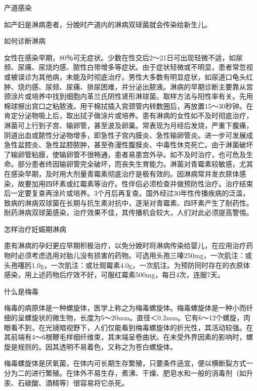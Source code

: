\documentclass[12pt,UTF8,openany]{ctexbook}
\begin{document}
产道感染

如产妇是淋病患者，分娩时产道内的淋病双球菌就会传染给新生儿。





如何诊断淋病


女性在感染早期，80％可无症状。少数在性交后2～21日可出现轻微不适，如尿频、尿痛、尿烧灼感、脓性白带增多等症状。由于症状轻微或不明显，患者常忽视或被误诊为其他病，未能及时彻底治疗。男性大多数有明显症状，如尿道口龟头红肿、烧灼感、尿频、尿痛、排尿困难，并分泌出脓液。淋病的早期诊断主要靠从宫颈涂片或培养中找到细胞内革兰氏阴性肾形淋球菌。取样方法与阳性率有关。先用棉球擦出宫口之粘脓液。用干棉拭插入宫颈管内转数圈后，再放置15～30秒钟。在肯定分泌物吸上后，取出拭子做涂片或培养。患有淋病的女性如不及时彻底治疗，淋菌可上行到子宫、输卵管，甚至波及卵巢。常表现为月经后发烧，严重下腹痛，阴道出血或脓性分泌物增多，即急性子宫内膜炎、急性输卵管炎。进一步可发展成急性盆腔炎、急性盆腔脓肿，甚至弥漫性腹膜炎、中毒性休克死亡。由于淋菌破坏了输卵管粘膜，使输卵管不很畅通，患者易患宫外孕。如不及时治疗，也可危及生命。部分患者终因输卵管完全破坏，而丧失生育能力。淋菌对青霉素较敏感，尤其在感染早期，及时用大剂量青霉素彻底治疗是极有效的。因淋病常并发衣原体感染，故要加用四环素或红霉素等治疗。性伴侣必须检查并做预防性治疗。治疗结束后一定要复查再涂片或培养。3个月后再复查。国外经过30年性传播疾病的泛滥，致病的淋病双球菌在长期与抗生素对抗中，逐渐对青霉素、四环素产生了耐药性。耐药淋病双球菌感染，治疗效果不佳，其传播机会较大，人们对此必须提高警惕。





怎样治疗妊娠期淋病


患有淋病的孕妇更应早期积极治疗，以免分娩时将淋病传染给婴儿，在应用治疗药物时必须考虑选用对胎儿没有损害的药物。可选用头孢三嗪250mg，一次肌注：或头孢噻肟1.0g，一次肌注：或壮观霉素4.0g，一次肌注。为预防同时存在的衣原体感染，用上述药物后疗效不好，可服红霉素500mg，每日4次，连服7天。





什么是梅毒


梅毒的病原体是一种螺旋体，医学上称之为梅毒螺旋体。梅毒螺旋体是一种小而纤细的呈螺旋状的微生物，长度为5～20mm。直径＜0.2mm。它有6～12个螺旋，肉眼看不到，在光镜暗视野下，人们仅能看到梅毒螺旋体的折光性，其活动较强。在其前端有4～6根鞭毛样细纤维束，其末端呈卷曲状。在未受外界因素的影响时，螺旋是规则的。因其透明不易着色，又称之为苍白螺旋体。

梅毒螺旋体是厌氧菌，在体内可长期生存繁殖，只要条件适宜，便以横断裂方式一分为二的进行繁殖。在体外不易生存，煮沸、干燥、肥皂水和一般的消毒剂（如升汞、石碳酸、酒精等）很容易将它杀死。
\end{document}
